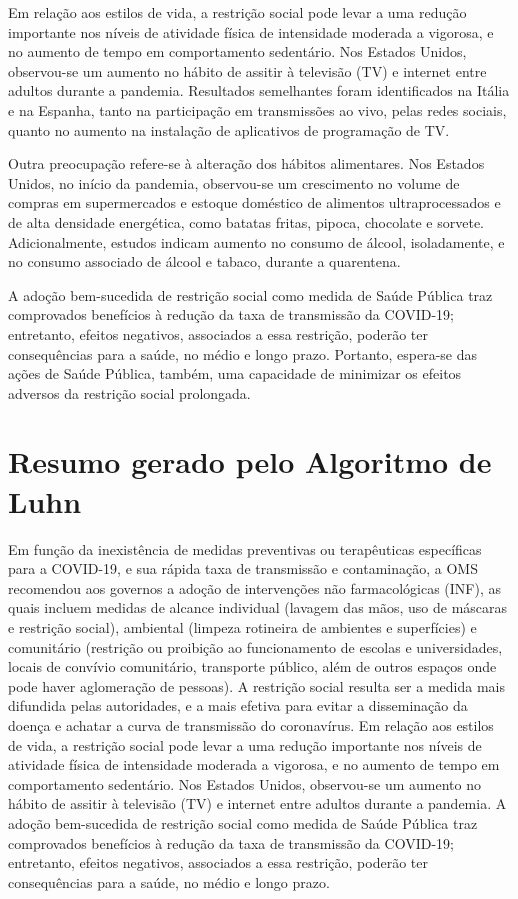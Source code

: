 Em relação aos estilos de vida, a restrição social pode levar a uma redução importante nos níveis de atividade física de intensidade moderada a vigorosa, e no aumento de tempo em comportamento sedentário. Nos Estados Unidos, observou-se um aumento no hábito de assitir à televisão (TV) e internet entre adultos durante a pandemia. Resultados semelhantes
foram identificados na Itália e na Espanha, tanto na participação em transmissões ao vivo, pelas redes sociais, quanto no aumento na instalação de aplicativos de programação de TV.

Outra preocupação refere-se à alteração dos hábitos alimentares. Nos Estados Unidos, no início da pandemia, observou-se um crescimento no volume de compras em supermercados e estoque doméstico de alimentos ultraprocessados e de alta densidade energética, como batatas fritas, pipoca, chocolate e sorvete. Adicionalmente, estudos indicam aumento no consumo de álcool, isoladamente, e no consumo associado de álcool e tabaco, durante a quarentena.

A adoção bem-sucedida de restrição social como medida de Saúde Pública traz comprovados benefícios à redução da taxa de transmissão da COVID-19; entretanto, efeitos negativos, associados a essa restrição, poderão ter consequências para a saúde, no médio e longo prazo. Portanto, espera-se das ações de Saúde Pública, também, uma capacidade de minimizar os efeitos adversos da restrição social prolongada.

\section{Resumo gerado pelo Algoritmo de Luhn}
\label{chap:luhn_resumo}
Em função da inexistência de medidas preventivas ou terapêuticas específicas para a COVID-19, e sua rápida taxa de transmissão e contaminação, a OMS recomendou aos governos a adoção de intervenções não farmacológicas (INF), as quais incluem medidas de alcance individual (lavagem das mãos, uso de máscaras e restrição social), ambiental (limpeza rotineira de ambientes e superfícies) e comunitário (restrição ou proibição ao funcionamento de escolas e universidades, locais de convívio comunitário, transporte público, além de outros espaços onde pode haver aglomeração de pessoas).
A restrição social resulta ser a medida mais difundida pelas autoridades, e a mais efetiva para evitar a disseminação da doença e achatar a curva de transmissão do coronavírus.
Em relação aos estilos de vida, a restrição social pode levar a uma redução importante nos níveis de atividade física de intensidade moderada a vigorosa, e no aumento de tempo em comportamento sedentário.
Nos Estados Unidos, observou-se um aumento no hábito de assitir à televisão (TV) e internet entre adultos durante a pandemia.
A adoção bem-sucedida de restrição social como medida de Saúde Pública traz comprovados benefícios à redução da taxa de transmissão da COVID-19; entretanto, efeitos negativos, associados a essa restrição, poderão ter consequências para a saúde, no médio e longo prazo.

